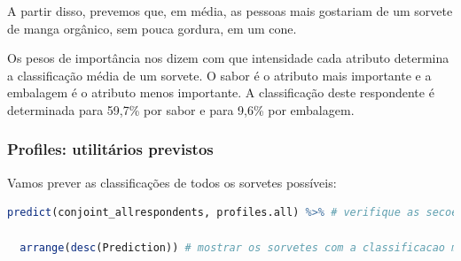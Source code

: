 \documentclass{article}
\begin{document}
A partir disso, prevemos que, em média, as pessoas mais gostariam de um sorvete de manga orgânico, sem pouca gordura, em um cone.

Os pesos de importância nos dizem com que intensidade cada atributo determina a classificação média de um sorvete. O sabor é o atributo mais importante e a embalagem é o atributo menos importante. A classificação deste respondente é determinada para 59,7\% por sabor e para 9,6\% por embalagem.

\subsubsection{Profiles: utilitários previstos}

Vamos prever as classificações de todos os sorvetes possíveis:

\begin{lstlisting}[language=R]
predict(conjoint_allrespondents, profiles.all) %>% # verifique as secoes anteriores para profiles.all

  arrange(desc(Prediction)) # mostrar os sorvetes com a classificacao mais alta prevista no topo
  

\end{lstlisting}
\end{document}
